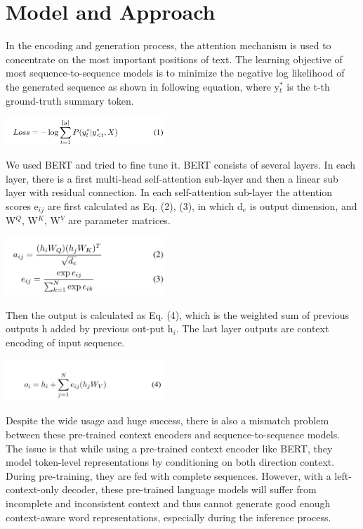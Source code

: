 \documentclass[twoside,twocolumn]{article}
\begin{document}

\section{Model and Approach}
In the encoding and generation process, the attention mechanism is used to concentrate on the most important positions of text. The 
learning objective of most sequence-to-sequence models is to minimize the negative log likelihood of the generated sequence as shown 
in following equation, where y$^*_{t}$ is the t-th ground-truth summary token.

\includegraphics[width=0.45\textwidth,height=0.9\textheight,keepaspectratio]{equal0.JPG}

We used BERT and tried to fine tune it. BERT consists of several layers. In each layer, there is a first multi-head self-attention 
sub-layer and then a linear sub layer with residual connection. In each self-attention sub-layer the attention scores e$_{ij}$ are 
first calculated as Eq. (2), (3), in which d$_{e}$ is output dimension, and W$^Q$, W$^K$, W$^V$ are parameter matrices. 

\includegraphics[width=0.45\textwidth,height=0.9\textheight,keepaspectratio]{equa1.JPG}

Then the output is calculated as Eq. (4), which is the weighted sum of previous outputs h added by previous out-put h$_{i}$. The last 
layer outputs are context encoding of input sequence.

\includegraphics[width=0.45\textwidth,height=0.9\textheight,keepaspectratio]{equa2.JPG}

Despite the wide usage and huge success, there is also a mismatch problem between these pre-trained context encoders and sequence-to-sequence 
models. The issue is that while using a pre-trained context encoder like BERT, they model token-level representations by conditioning on both 
direction context. During pre-training, they are fed with complete sequences. However, with a left-context-only decoder, these pre-trained 
language models will suffer from incomplete and inconsistent context and thus cannot generate good enough context-aware word representations, 
especially during the inference process.
\end{document}
